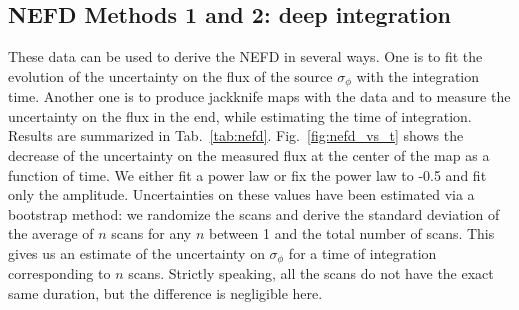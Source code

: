 \subsection{NEFD Methods 1 and 2: deep integration}

These data can be used to derive the NEFD in several ways. One is to fit the
evolution of the uncertainty on the flux of the source $\sigma_\phi$ with the
integration time. Another one is to produce jackknife maps with the data and to
measure the uncertainty on the flux in the end, while estimating the time of
integration. Results are summarized in
Tab.~\ref{tab:nefd}. Fig.~\ref{fig:nefd_vs_t} shows the decrease of the
uncertainty on the measured flux at the center of the map as a function of
time. We either fit a power law or fix the power law to -0.5 and fit only the
amplitude. Uncertainties on these values have been estimated via a bootstrap
method: we randomize the scans and derive the standard deviation of the average
of $n$ scans for any $n$ between 1 and the total number of scans. This gives us
an estimate of the uncertainty on $\sigma_\phi$ for a time of integration
corresponding to $n$ scans. Strictly speaking, all the scans do not have the
exact same duration, but the difference is negligible here.



